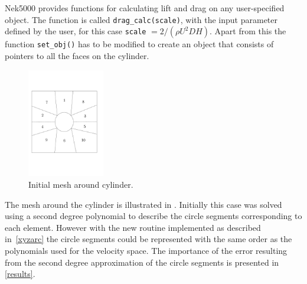 Nek5000 provides functions for calculating lift and drag on any user-specified object.
The function is called \verb|drag_calc(scale)|, with the input parameter 
defined by the user, for this case \verb|scale| $=2/(\rho U^2DH)$.  
Apart from this the function \verb|set_obj()| has to be modified to create an object 
that consists of pointers to all the faces on the cylinder.
%
\begin{figure}[h]
    \centering
    \includegraphics[width = 0.3\textwidth]{Figures/cyl_elem.pdf}
    \caption{Initial mesh around cylinder.}
    \label{fig:cyl_elem}
\end{figure}
%
The mesh around the cylinder is illustrated in .
Initially this case was solved using a second degree polynomial to describe the circle segments
corresponding to each element. However with the new routine implemented as described 
in~\cref{xyzarc} the circle segments could be represented with the same order as 
the polynomials used for the velocity space. The importance of the error resulting 
from the second degree approximation of the circle segments is presented in \cref{results}.

